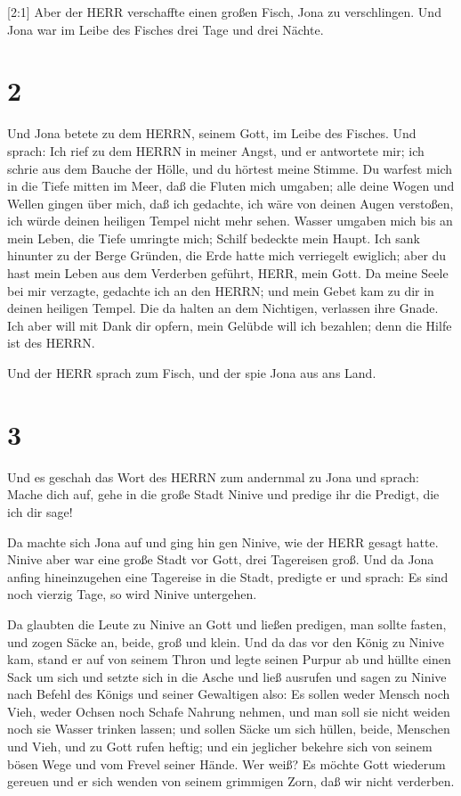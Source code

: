  {[}2:1{]} Aber der HERR verschaffte einen großen Fisch,
Jona zu verschlingen. Und Jona war im Leibe des Fisches drei Tage und
drei Nächte.

\hypertarget{section-1}{%
\section{2}\label{section-1}}

 Und Jona betete zu dem HERRN, seinem Gott, im Leibe des
Fisches.  Und sprach: Ich rief zu dem HERRN in meiner Angst,
und er antwortete mir; ich schrie aus dem Bauche der Hölle, und du
hörtest meine Stimme.  Du warfest mich in die Tiefe mitten
im Meer, daß die Fluten mich umgaben; alle deine Wogen und Wellen gingen
über mich,  daß ich gedachte, ich wäre von deinen Augen
verstoßen, ich würde deinen heiligen Tempel nicht mehr sehen.
 Wasser umgaben mich bis an mein Leben, die Tiefe umringte
mich; Schilf bedeckte mein Haupt.  Ich sank hinunter zu der
Berge Gründen, die Erde hatte mich verriegelt ewiglich; aber du hast
mein Leben aus dem Verderben geführt, HERR, mein Gott.  Da
meine Seele bei mir verzagte, gedachte ich an den HERRN; und mein Gebet
kam zu dir in deinen heiligen Tempel.  Die da halten an dem
Nichtigen, verlassen ihre Gnade.  Ich aber will mit Dank dir
opfern, mein Gelübde will ich bezahlen; denn die Hilfe ist des HERRN.

 Und der HERR sprach zum Fisch, und der spie Jona aus ans
Land.

\hypertarget{section-2}{%
\section{3}\label{section-2}}

 Und es geschah das Wort des HERRN zum andernmal zu Jona und
sprach:  Mache dich auf, gehe in die große Stadt Ninive und
predige ihr die Predigt, die ich dir sage!

 Da machte sich Jona auf und ging hin gen Ninive, wie der
HERR gesagt hatte. Ninive aber war eine große Stadt vor Gott, drei
Tagereisen groß.  Und da Jona anfing hineinzugehen eine
Tagereise in die Stadt, predigte er und sprach: Es sind noch vierzig
Tage, so wird Ninive untergehen.

 Da glaubten die Leute zu Ninive an Gott und ließen
predigen, man sollte fasten, und zogen Säcke an, beide, groß und klein.
 Und da das vor den König zu Ninive kam, stand er auf von
seinem Thron und legte seinen Purpur ab und hüllte einen Sack um sich
und setzte sich in die Asche  und ließ ausrufen und sagen zu
Ninive nach Befehl des Königs und seiner Gewaltigen also: Es sollen
weder Mensch noch Vieh, weder Ochsen noch Schafe Nahrung nehmen, und man
soll sie nicht weiden noch sie Wasser trinken lassen;  und
sollen Säcke um sich hüllen, beide, Menschen und Vieh, und zu Gott rufen
heftig; und ein jeglicher bekehre sich von seinem bösen Wege und vom
Frevel seiner Hände.  Wer weiß? Es möchte Gott wiederum
gereuen und er sich wenden von seinem grimmigen Zorn, daß wir nicht
verderben.

